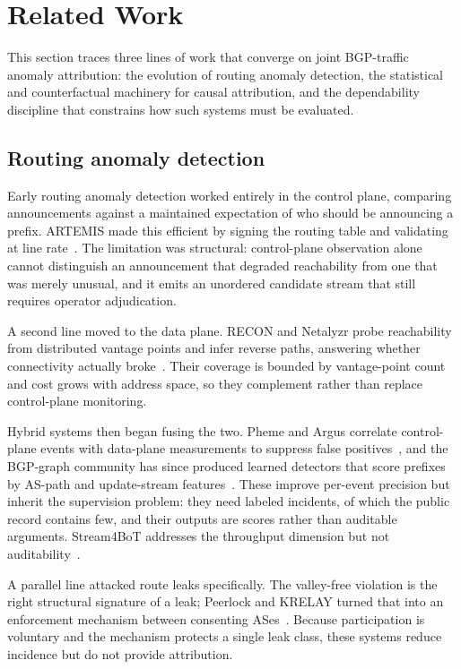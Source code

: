 \section{Related Work}
\label{sec:related}

This section traces three lines of work that converge on joint BGP-traffic anomaly attribution: the evolution of routing anomaly detection, the statistical and counterfactual machinery for causal attribution, and the dependability discipline that constrains how such systems must be evaluated.

\subsection{Routing anomaly detection}

Early routing anomaly detection worked entirely in the control plane, comparing announcements against a maintained expectation of who should be announcing a prefix. ARTEMIS made this efficient by signing the routing table and validating at line rate~\cite{artemis}. The limitation was structural: control-plane observation alone cannot distinguish an announcement that degraded reachability from one that was merely unusual, and it emits an unordered candidate stream that still requires operator adjudication.

A second line moved to the data plane. RECON and Netalyzr probe reachability from distributed vantage points and infer reverse paths, answering whether connectivity actually broke~\cite{netalyzr-2013}. Their coverage is bounded by vantage-point count and cost grows with address space, so they complement rather than replace control-plane monitoring.

Hybrid systems then began fusing the two. Pheme and Argus correlate control-plane events with data-plane measurements to suppress false positives~\cite{pheme-2020,argus-2019}, and the BGP-graph community has since produced learned detectors that score prefixes by AS-path and update-stream features~\cite{keegan-2023-bgp-graph,beam2024}. These improve per-event precision but inherit the supervision problem: they need labeled incidents, of which the public record contains few, and their outputs are scores rather than auditable arguments. Stream4BoT addresses the throughput dimension but not auditability~\cite{stream4r-2020}.

A parallel line attacked route leaks specifically. The valley-free violation is the right structural signature of a leak; Peerlock and KRELAY turned that into an enforcement mechanism between consenting ASes~\cite{peerlock,krerelay-2019}. Because participation is voluntary and the mechanism protects a single leak class, these systems reduce incidence but do not provide attribution.

